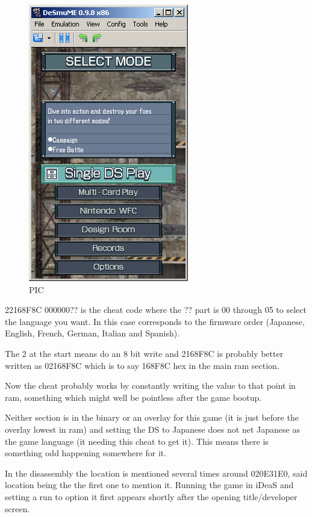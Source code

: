 \documentclass[
]{book}
\begin{document}
\begin{figure}
\centering
\includegraphics{images/216_home_fast6191_romhackingguide_unrenamed_fil___iginal_borders_romhackguideasmlanguagemod_1.png}
\caption{PIC}
\end{figure}

22168F8C 000000?? is the cheat code where the ?? part is 00 through 05 to select the language you want. In this case corresponds to the firmware order (Japanese, English, French, German, Italian and Spanish).

The 2 at the start means do an 8 bit write and 2168F8C is probably better written as 02168F8C which is to say 168F8C hex in the main ram section.

Now the cheat probably works by constantly writing the value to that point in ram, something which might well be pointless after the game bootup.

Neither section is in the binary or an overlay for this game (it is just before the overlay lowest in ram) and setting the DS to Japanese does not net Japanese as the game language (it needing this cheat to get it). This means there is something odd happening somewhere for it.

In the disassembly the location is mentioned several times around 020E31E0, said location being the the first one to mention it. Running the game in iDeaS and setting a run to option it first appears shortly after the opening title/developer screen.
\end{document}
